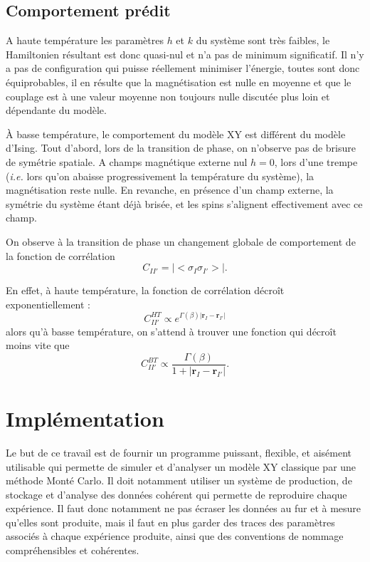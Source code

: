 \documentclass[a4paper, 11pt]{article}
\newcommand{\vr}{\bm{r}}
\begin{document}
\subsection{Comportement prédit}

A haute température les paramètres $h$ et $k$ du système sont très faibles, le Hamiltonien résultant
est donc quasi-nul et n'a pas de minimum significatif. Il n'y a pas de configuration qui puisse
réellement minimiser l'énergie, toutes sont donc équiprobables, il en résulte que la magnétisation
est nulle en moyenne et que le couplage est à une valeur moyenne non toujours nulle discutée plus
loin et dépendante du modèle. 

À basse température, le comportement du modèle XY est différent du modèle d'Ising. Tout d'abord, lors
de la transition de phase, on n'observe pas de brisure de symétrie spatiale. A champs magnétique
externe nul $h=0$, lors d'une trempe (\emph{i.e.} lors qu'on abaisse progressivement la température du
système), la magnétisation reste nulle. En revanche, en présence d'un champ externe, la symétrie du
système étant déjà brisée, et les spins s'alignent effectivement avec ce champ. 

On observe à la transition de phase un changement globale de comportement de la fonction de corrélation
\begin{equation}
    C_{II'} = \big|\big< \sigma_I \sigma_{I'} \big>\big|.
\end{equation}

En effet, à haute température, la fonction de corrélation décroît exponentiellement :
\begin{equation}
    C_{II'}^{HT} \propto e^{\Gamma(\beta) |\vr_I - \vr_{I'}|}
\end{equation}
alors qu'à basse température, on s'attend à trouver une fonction qui décroît moins vite que 
\begin{equation}
    C_{II'}^{BT} \propto \frac{\Gamma(\beta)}{1+|\vr_I - \vr_{I'}|}.
\end{equation}



\section{Implémentation}

Le but de ce travail est de fournir un programme puissant, flexible, et aisément utilisable qui
permette de simuler et d'analyser un modèle XY classique par une méthode Monté Carlo. Il doit
notamment utiliser un système de production, de stockage et d'analyse des données cohérent qui
permette de reproduire chaque expérience. Il faut donc notamment ne pas écraser les données au fur
et à mesure qu'elles sont produite, mais il faut en plus garder des traces des paramètres associés à
chaque expérience produite, ainsi que des conventions de nommage compréhensibles et cohérentes.
\end{document}

